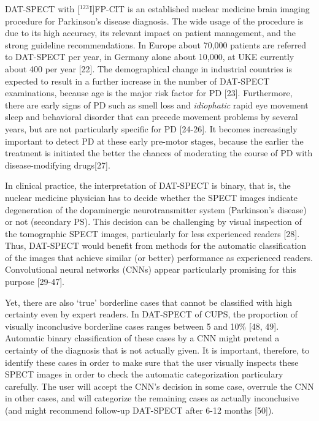 DAT-SPECT with [$^{123}$I]FP-CIT is an established nuclear medicine brain imaging procedure for Parkinson's disease diagnosis.
The wide usage of the procedure is due to its high accuracy, its relevant impact on patient management, 
and the strong guideline recommendations.
In Europe about 70,000 patients are referred to DAT-SPECT per year, in Germany alone about 10,000, at UKE currently about 400 per year [22]. 
The demographical change in industrial countries is expected to result in a further increase in the number of DAT-SPECT examinations, 
because age is the major risk factor for PD [23]. 
Furthermore, there are early signs of PD such as smell loss and \textit{idiophatic} rapid eye movement sleep and behavioral disorder 
that can precede movement problems by several years, but are not particularly specific for PD [24-26]. 
It becomes increasingly important to detect PD at these early pre-motor stages, because the earlier the treatment is initiated the better 
the chances of moderating the course of PD with disease-modifying drugs[27].


In clinical practice, the interpretation of DAT-SPECT is binary, that is, the nuclear medicine physician has to decide whether the SPECT images 
indicate degeneration of the dopaminergic neurotransmitter system (Parkinson's disease) or not (secondary PS). 
This decision can be challenging by visual inspection of the tomographic SPECT images, particularly for less experienced readers [28]. 
Thus, DAT-SPECT would benefit from methods for the automatic classification of the images that achieve similar (or better) performance as experienced readers. 
Convolutional neural networks (CNNs) appear particularly promising for this purpose [29-47].


Yet, there are also `true' borderline cases that cannot be classified with high certainty even by expert readers. 
In DAT-SPECT of CUPS, the proportion of visually inconclusive borderline cases ranges between 5 and 10\% [48, 49]. 
Automatic binary classification of these cases by a CNN might pretend a certainty of the diagnosis that is not actually given. 
It is important, therefore, to identify these cases in order to make sure that the user visually inspects these SPECT images 
in order to check the automatic categorization particulary carefully. 
The user will accept the CNN's decision in some case, overrule the CNN in other cases, and will categorize the remaining cases as 
actually inconclusive (and might recommend follow-up DAT-SPECT after 6-12 months [50]). 


